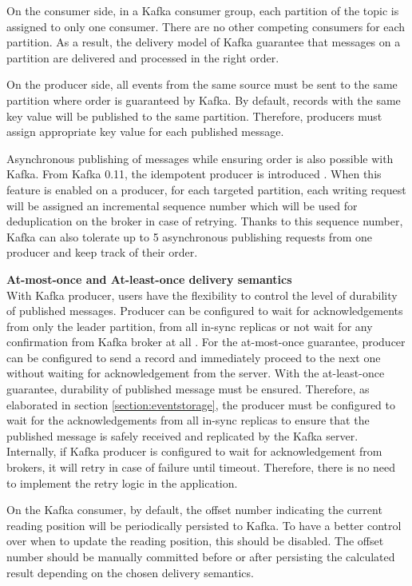 On the consumer side, in a Kafka consumer group, each partition of the topic is assigned to only one consumer. There are no other competing consumers for each partition. As a result, the delivery model of Kafka guarantee that messages on a partition are delivered and processed in the right order.

On the producer side, all events from the same source must be sent to the same partition where order is guaranteed by Kafka. By default, records with the same key value will be published to the same partition. Therefore, producers must assign appropriate key value for each published message.

Asynchronous publishing of messages while ensuring order is also possible with Kafka. From Kafka 0.11, the idempotent producer is introduced \cite{kafkatransaction}. When this feature is enabled on a producer, for each targeted partition, each writing request will be assigned an incremental sequence number which will be used for deduplication on the broker in case of retrying. Thanks to this sequence number, Kafka can also tolerate up to 5 asynchronous publishing requests from one producer and keep track of their order.

\textbf{At-most-once and At-least-once delivery semantics}\\
With Kafka producer, users have the flexibility to control the level of durability of published messages. Producer can be configured to wait for acknowledgements from only the leader partition, from all in-sync replicas or not wait for any confirmation from Kafka broker at all \cite{kafkaconfigurationproducer}. For the at-most-once guarantee, producer can be configured to send a record and immediately proceed to the next one without waiting for acknowledgement from the server. With the at-least-once guarantee, durability of published message must be ensured. Therefore, as elaborated in section \ref{section:eventstorage}, the producer must be configured to wait for the acknowledgements from all in-sync replicas to ensure that the published message is safely received and replicated by the Kafka server. Internally, if Kafka producer is configured to wait for acknowledgement from brokers, it will retry in case of failure until timeout. Therefore, there is no need to implement the retry logic in the application. 

On the Kafka consumer, by default, the offset number indicating the current reading position will be periodically persisted to Kafka. To have a better control over when to update the reading position, this should be disabled. The offset number should be manually committed before or after persisting the calculated result depending on the chosen delivery semantics.   

